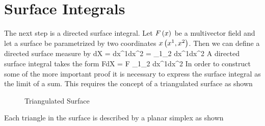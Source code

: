 \section{Surface Integrals}
The next step is a directed surface integral. Let ${F}\left ( {x} \right )$ be a multivector field and let a surface
be parametrized by two coordinates ${x}\left ( {x^{1},x^{2}} \right )$.  Then we can define a directed surface measure by
\be
dX = \w{}\: dx^{1}dx^{2} = \eb_{1}\w\eb_{2}\; dx^{1}dx^{2}
\ee
A directed surface integral takes the form
\be
\int F\:dX = \int F \eb_{1}\w\eb_{2}\: dx^{1}dx^{2}
\ee
In order to construct some of the more important proof it is necessary to express the surface integral
as the limit of a sum. This requires the concept of a triangulated surface as shown
\begin{figure}[htbp]
\begin{center}
\caption{Triangulated Surface}
\end{center}
\end{figure}
Each triangle in the surface is described by a planar simplex as shown
